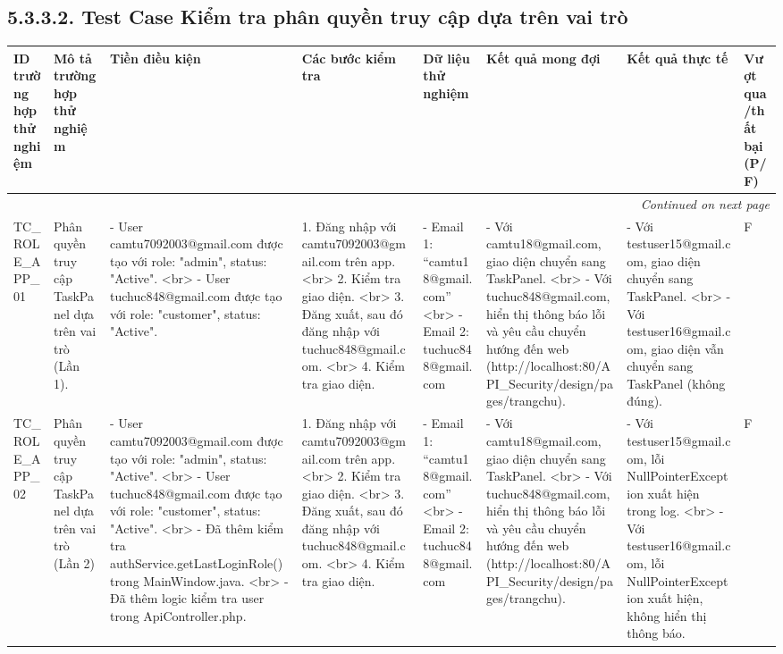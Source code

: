 \documentclass[a4paper,12pt]{article}
\begin{document}
\subsection{5.3.3.2. Test Case Kiểm tra phân quyền truy cập dựa trên vai trò}
\begin{longtable}{|p{2cm}|p{3cm}|p{3cm}|p{4cm}|p{3cm}|p{3cm}|p{3cm}|p{2cm}|}
    \hline
    \textbf{ID trường hợp thử nghiệm} & \textbf{Mô tả trường hợp thử nghiệm} & \textbf{Tiền điều kiện} & \textbf{Các bước kiểm tra} & \textbf{Dữ liệu thử nghiệm} & \textbf{Kết quả mong đợi} & \textbf{Kết quả thực tế} & \textbf{Vượt qua/thất bại (P/F)} \\ \hline
    \endhead
    \hline
    \multicolumn{8}{|r|}{\textit{Continued on next page}} \\
    \hline
    \endfoot
    \hline
    \endlastfoot
    TC_ROLE_APP_01 & Phân quyền truy cập TaskPanel dựa trên vai trò (Lần 1). & - User camtu7092003@gmail.com được tạo với role: "admin", status: "Active". <br> - User tuchuc848@gmail.com được tạo với role: "customer", status: "Active". & 1. Đăng nhập với camtu7092003@gmail.com trên app. <br> 2. Kiểm tra giao diện. <br> 3. Đăng xuất, sau đó đăng nhập với tuchuc848@gmail.com. <br> 4. Kiểm tra giao diện. & - Email 1: “camtu18@gmail.com” <br> - Email 2: tuchuc848@gmail.com & - Với camtu18@gmail.com, giao diện chuyển sang TaskPanel. <br> - Với tuchuc848@gmail.com, hiển thị thông báo lỗi và yêu cầu chuyển hướng đến web (http://localhost:80/API_Security/design/pages/trangchu). & - Với testuser15@gmail.com, giao diện chuyển sang TaskPanel. <br> - Với testuser16@gmail.com, giao diện vẫn chuyển sang TaskPanel (không đúng). & F \\ \hline
    TC_ROLE_APP_02 & Phân quyền truy cập TaskPanel dựa trên vai trò (Lần 2) & - User camtu7092003@gmail.com được tạo với role: "admin", status: "Active". <br> - User tuchuc848@gmail.com được tạo với role: "customer", status: "Active". <br> - Đã thêm kiểm tra authService.getLastLoginRole() trong MainWindow.java. <br> - Đã thêm logic kiểm tra user trong ApiController.php. & 1. Đăng nhập với camtu7092003@gmail.com trên app. <br> 2. Kiểm tra giao diện. <br> 3. Đăng xuất, sau đó đăng nhập với tuchuc848@gmail.com. <br> 4. Kiểm tra giao diện. & - Email 1: “camtu18@gmail.com” <br> - Email 2: tuchuc848@gmail.com & - Với camtu18@gmail.com, giao diện chuyển sang TaskPanel. <br> - Với tuchuc848@gmail.com, hiển thị thông báo lỗi và yêu cầu chuyển hướng đến web (http://localhost:80/API_Security/design/pages/trangchu). & - Với testuser15@gmail.com, lỗi NullPointerException xuất hiện trong log. <br> - Với testuser16@gmail.com, lỗi NullPointerException xuất hiện, không hiển thị thông báo. & F \\ \hline

\end{longtable}
\end{document}

